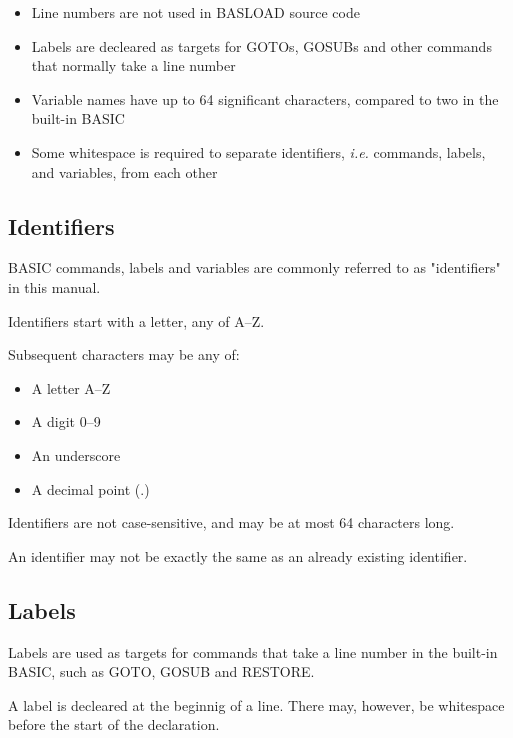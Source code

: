\documentclass{article}
\begin{document}
        \begin{itemize}
            \item Line numbers are not used in BASLOAD source code
            \item Labels are decleared as targets for GOTOs, GOSUBs and
                  other commands that normally take a line number
            \item Variable names have up to 64 significant characters, compared to two
                  in the built-in BASIC
            \item Some whitespace is required to separate identifiers, 
                  \textit{i.e.} commands, labels, and variables, from each other
                  
        \end{itemize}
    
    \subsection{Identifiers}

        BASIC commands, labels and variables are commonly referred to as "identifiers" in this
        manual.

        Identifiers start with a letter, any of A--Z.

        Subsequent characters may be any of:

        \begin{itemize}
            \item A letter A--Z
            \item A digit 0--9 
            \item An underscore 
            \item A decimal point (.)
        \end{itemize}

        Identifiers are not case-sensitive, and may be at most 64 characters long.

        An identifier may not be exactly the same as an already existing identifier.

    \subsection{Labels}

        Labels are used as targets for commands that take a line number in
        the built-in BASIC, such as GOTO, GOSUB and RESTORE.

        A label is decleared at the beginnig of a line. There may, however,
        be whitespace before the start of the declaration.
\end{document}

